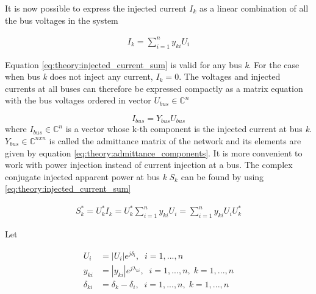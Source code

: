 \documentclass[class=book, crop=false]{standalone}
\begin{document}
It is now possible to  express the injected current $I_{k}$ as a linear combination of all the bus voltages in the system 

\begin{equation}
    \begin{aligned}\label{eq:theory:injected_current_sum}
    I_{k} = \sum_{i=1}^{n} y_{ki}U_{i}
    \end{aligned} 
\end{equation}

Equation \eqref{eq:theory:injected_current_sum} is valid for any bus \textit{k}. For the case when bus \textit{k} does not inject any current, $I_{k} = 0$. The voltages and injected currents at all buses can therefore be expressed compactly as a matrix equation with the bus voltages ordered in vector $U_{bus}  \in{\boldsymbol{\mathbb{C}}^{n}}$

\begin{equation}\label{eq:theory:powerflow_busmatrix}
I_{bus} = Y_{bus}U_{bus}
\end{equation}
where $I_{bus} \in{\boldsymbol{\mathbb{C}}^{n}}$ is a vector whose k-th component is the injected current at bus \textit{k}. $Y_{bus}\in{\boldsymbol{\mathbb{C}}^{nxn}}$ is called the admittance matrix of the network and its elements are given by equation \eqref{eq:theory:admittance_components}. It is more convenient to work with power injection instead of current injection at a bus. The complex conjugate injected apparent power at bus \textit{k} $S_{k}$ can be found by using \eqref{eq:theory:injected_current_sum}

\begin{equation}
    \begin{aligned}\label{eq:theory:injected_power_sum}
    S^{*}_{k} = U^{*}_{k}I_{k} = U^{*}_{k}\sum_{i=1}^{n} y_{ki}U_{i}
    = \sum_{i=1}^{n} y_{ki}U_{i}U^{*}_{k}
    \end{aligned} 
\end{equation}


Let

\begin{equation}
    \begin{aligned}\label{eq:theory:injected_power_sum_varialbes}
    U_{i} &= |U_{i}|e^{j\delta_{i}}, \;\; i = 1,...,n \\
    y_{ki} &= |y_{ki}|e^{j\lambda_{ki}}, \;\; i = 1,...,n, \; k = 1,...,n \\
    \delta_{ki} &= \delta_{k} - \delta_{i}, \;\; i = 1,...,n, \; k = 1,...,n 
    \end{aligned} 
\end{equation}
\end{document}
